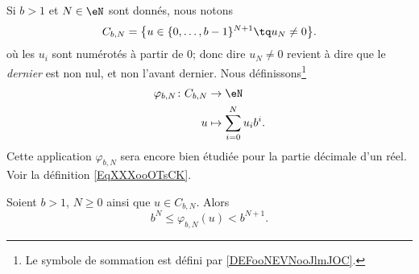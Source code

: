 \begin{normaltext}	\label{NORooTuplesChiffres}
	Si \( b>1\) et \( N\in \eN\) sont donnés, nous notons
	\begin{equation}
		C_{b,N}=\big\{  u\in \{ 0,\ldots, b-1 \}^{N+1}\tq u_N\neq 0  \big\}.
	\end{equation}
	où les \( u_i\) sont numérotés à partir de \( 0\); donc dire \( u_N\neq 0\) revient à dire que le \emph{dernier} est non nul, et non l'avant dernier. Nous définissons\footnote{Le symbole de sommation est défini par \ref{DEFooNEVNooJlmJOC}.}
	\begin{equation}        \label{EQooWWTUooHAnSEv}
		\begin{aligned}
			\varphi_{b,N}\colon C_{b,N} & \to \eN                     \\
			u                           & \mapsto \sum_{i=0}^Nu_ib^i.
		\end{aligned}
	\end{equation}
	Cette application \( \varphi_{b,N}\) sera encore bien étudiée pour la partie décimale d'un réel. Voir la définition \ref{EqXXXooOTsCK}.
\end{normaltext}

\begin{lemma}       \label{LEMooJUGKooGsbrhi}
	Soient \( b>1\), \( N\geq 0\) ainsi que \( u\in C_{b,N}\). Alors
	\begin{equation}        \label{EQooYHTLooNwqIIq}
		b^N\leq \varphi_{b,N}(u)<b^{N+1}.
	\end{equation}
\end{lemma}

